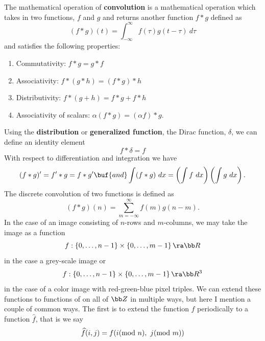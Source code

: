 \documentclass[12pt,letterpaper]{article}
\renewcommand{\hat}{\widehat}
\begin{document}
The mathematical operation of \textbf{convolution} is a mathematical operation which takes in two functions, $f$ and $g$ and returns another function $f\ast g$ defined as
\begin{equation*}
    (f\ast g)(t) = \int_{-\infty}^\infty f(\tau)g(t-\tau)~d\tau
\end{equation*}
and satisfies the following properties:
\begin{enumerate}
    \item Commutativity:  $f\ast g = g \ast f$
    \item Associativity:  $f\ast(g\ast h) = (f\ast g)\ast h$
    \item Distributivity:  $f\ast (g+h) = f\ast g + f \ast h$
    \item Associativity of scalars:  $\alpha(f\ast g) = (\alpha f) \ast g$.
\end{enumerate}
Using the \textbf{distribution} or \textbf{generalized function}, the Dirac function, $\delta$, we can define an identity element
\begin{equation*}
    f\ast \delta = f
\end{equation*}
With respect to differentiation and integration we have
\begin{equation*}
    (f\ast g)' = f'\ast g = f\ast g' \buf{and}
    \int (f\ast g)~dx = \left( \int f~dx \right)\left( \int g~dx \right).
\end{equation*}
The discrete convolution of two functions is defined as
\begin{equation*}
    (f\ast g)(n) = \sum_{m=-\infty}^\infty f(m)g(n-m).
\end{equation*}
In the case of an image consisting of $n$-rows and $m$-columns, we may take the image as a function 
\begin{equation*}
    f:\left\{ 0, \ldots, n-1 \right\}\times\left\{ 0, \ldots, m-1 \right\} \ra \bb R
\end{equation*}
in the case a grey-scale image or
\begin{equation*}
    f:\left\{ 0, \ldots, n-1 \right\}\times\left\{ 0, \ldots, m-1 \right\} \ra \bb R^3
\end{equation*}
in the case of a color image with red-green-blue pixel triples.
We can extend these functions to functions of on all of $\bb Z$ in multiple ways, but here I mention a couple of common ways.
The first is to extend the function $f$ periodically to a function $\hat f$, that is we say
\begin{equation*}
    \hat f(i,j) = f(i \hspace{-1ex}\pmod n, ~j\hspace{-1ex}\pmod m)
\end{equation*}
\end{document}
